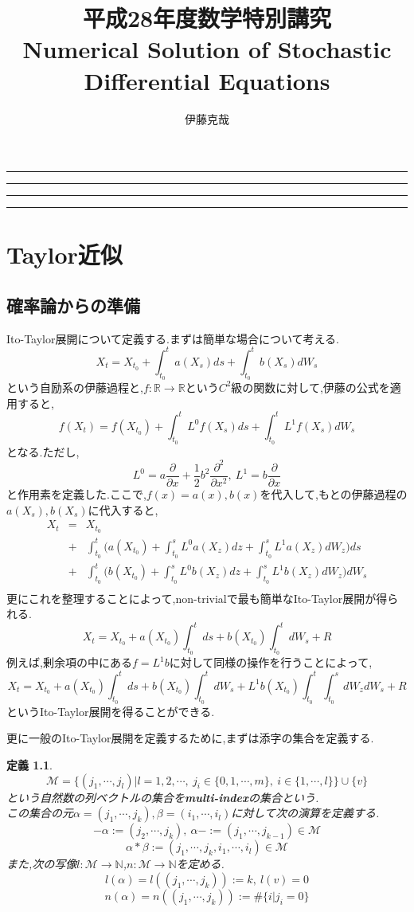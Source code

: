 \documentclass[a4paper,dvipdfmx]{jreport}
\title{平成28年度数学特別講究\\Numerical Solution of Stochastic Differential Equations}
\author{伊藤克哉}
\makeatletter
\numberwithin{equation}{section}
\newtheorem{Def}     [Thm]{定義}
\renewenvironment{leftbar}{%
  \def\FrameCommand{\vrule width 1pt \hspace{10pt}}%
  \MakeFramed {\advance\hsize-\width \FrameRestore}}%
 {\endMakeFramed}
\def\N{\mathbb N}
\def\R{\mathbb R}
\def\defb{\begin{leftbar}\begin{Def}}
\def\defx{\end{Def}\end{leftbar}}
\def\eqa{\begin{eqnarray}}
\def\eqax{\end{eqnarray}}
\def\eqa*{\begin{eqnarray*}}
\def\eqax*{\end{eqnarray*}}
\renewcommand{\maketitle}{\begin{titlepage}%
    \let\footnotesize\small
    \let\footnoterule\relax
    \parindent \z@
    \reset@font
    \null
    \vskip 50\p@
    \begin{center}
      \hrule height 1pt
      \vskip 2pt 
      \hrule
      \vskip 3pt
      {\huge \bfseries \strut \@title \strut}\par
      \vskip 2pt
      \hrule
      \vskip 2pt
      \hrule height 1pt
    \end{center}
    \vskip 50\p@
    \begin{flushright}
      \Large \@author \par
    \end{flushright}
    \vfil
    \null
    \begin{flushright}
        {\small \@date}%
    \end{flushright}
  \end{titlepage}%
  \setcounter{footnote}{0}%
}
\makeatother
\begin{document}
\maketitle
\tableofcontents

\chapter{Taylor近似}
\section{確率論からの準備}
Ito-Taylor展開について定義する.まずは簡単な場合について考える.
\[
X_t = X_{t_0} + \int_{t_0}^t a(X_s)ds +  \int_{t_0}^t b(X_s)dW_s
\]
という自励系の伊藤過程と,$f:\R\to\R$という$C^2$級の関数に対して,伊藤の公式を適用すると,
\[
f(X_t) = f(X_{t_0}) + \int_{t_0}^t L^0 f(X_s)ds +  \int_{t_0}^t L^1f(X_s)dW_s
\]
となる.ただし,
\[
L^0 = a\frac{\partial}{\partial x} + \frac{1}{2}b^2\frac{\partial^2}{\partial x^2},\  
L^1 = b\frac{\partial}{\partial x}
\]
と作用素を定義した.ここで,$f(x) = a(x),b(x)$を代入して,もとの伊藤過程の$a(X_s),b(X_s)$に代入すると,
\eqa*
X_t &=& X_{t_0} \\
&+& \int_{t_0}^t \biggl( a(X_{t_0}) + \int_{t_0}^s L^0 a(X_z)dz +  \int_{t_0}^s L^1a(X_z)dW_z \biggl) ds \\
&+& \int_{t_0}^t \biggl( b(X_{t_0}) + \int_{t_0}^s L^0 b(X_z)dz +  \int_{t_0}^s L^1b(X_z)dW_z \biggl) dW_s\\
\eqax*
更にこれを整理することによって,non-trivialで最も簡単なIto-Taylor展開が得られる.
\[
X_t = X_{t_0} +a(X_{t_0}) \int_{t_0}^t ds + b(X_{t_0})  \int_{t_0}^t dW_s + R
\]
例えば,剰余項の中にある$f= L^1b$に対して同様の操作を行うことによって,
\[
X_t = X_{t_0} +a(X_{t_0}) \int_{t_0}^t ds + b(X_{t_0})  \int_{t_0}^t dW_s +
L^1 b(X_{t_0})  \int_{t_0}^t \int_{t_0}^s dW_z dW_s  + R
\]
というIto-Taylor展開を得ることができる.\par
更に一般のIto-Taylor展開を定義するために,まずは添字の集合を定義する.
\defb
\[
\mathcal M = \{ (j_1,\cdots,j_l) | l=1,2,\cdots, \  j_i \in \{0,1,\cdots,m\} , \ i \in \{1,\cdots,l\}\}\cup\{v\}
\]
という自然数の列ベクトルの集合を{\bf multi-index}の集合という.\\
この集合の元$\alpha = (j_1,\cdots,j_k),\beta = (i_1,\cdots,i_l)$に対して次の演算を定義する.\\
\[
- \alpha := (j_2,\cdots,j_k) , \ \alpha - := (j_1,\cdots,j_{k-1}) \in \mathcal M
\]
\[
\alpha * \beta := (j_1,\cdots,j_k,i_1,\cdots,i_l) \in \mathcal M
\]
また,次の写像$l:\mathcal M \to \N$,$n:\mathcal M \to \N$を定める.
\[
l(\alpha) = l( (j_1,\cdots,j_k)) := k,\ l(v) = 0
\]
\[
n(\alpha) = n( (j_1,\cdots,j_k)) := \# \{ i | j_i = 0 \}
\]
\defx
\end{document}
